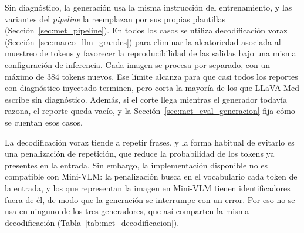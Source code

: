Sin diagnóstico, la generación usa la misma instrucción del entrenamiento, y las variantes del \emph{pipeline} la
reemplazan por sus propias plantillas (Sección~\ref{sec:met_pipeline}). En todos los casos se utiliza decodificación voraz (Sección~\ref{sec:marco_llm_grandes}) para eliminar la aleatoriedad asociada al muestreo de tokens y favorecer la reproducibilidad de las salidas bajo una misma configuración de inferencia. Cada imagen se procesa por separado, con
un máximo de 384 tokens nuevos. Ese límite alcanza para que casi todos los reportes con diagnóstico inyectado terminen,
pero corta la mayoría de los que LLaVA-Med escribe sin diagnóstico. Además, si el corte llega mientras el generador
todavía razona, el reporte queda vacío, y la Sección~\ref{sec:met_eval_generacion} fija cómo se cuentan esos casos.

La decodificación voraz tiende a repetir frases, y la forma habitual de evitarlo es una penalización de repetición, que
reduce la probabilidad de los tokens ya presentes en la entrada. Sin embargo, la implementación disponible no es
compatible con Mini-VLM: la penalización busca en el vocabulario cada token de la entrada, y los que representan la
imagen en Mini-VLM tienen identificadores fuera de él, de modo que la generación se interrumpe con un error. Por eso
no se usa en ninguno de los tres generadores, que así comparten la misma decodificación
(Tabla~\ref{tab:met_decodificacion}).


